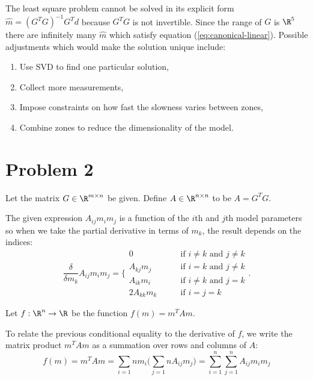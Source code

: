 \documentclass{homework}
\begin{document}
\begin{letterenum}
\item The least square problem cannot be solved in its explicit form $\hat{m} = (G^T G)^{-1} G^T d$ because $G^T G$ is not invertible.
Since the range of $G$ is $\R^5$ there are infinitely many $\hat{m}$ which satisfy equation (\ref{eq:canonical-linear}). Possible adjustments which
would make the solution unique include:
\begin{enumerate}
    \item Use SVD to find one particular solution,
    \item Collect more measurements,
    \item Impose constraints on how fast the slowness varies between zones,
    \item Combine zones to reduce the dimensionality of the model.
\end{enumerate}

\end{letterenum}

\section{Problem 2}
Let the matrix $G\in\R^{m \times n}$ be given. Define $A\in \R^{n\times n}$ to be $A = G^T G$.

The given expression $A_{ij} m_i m_j$ is a function of the $i$th and $j$th model parameters so when we 
take the partial derivative in terms of $m_k$, the result depends on the indices:
\begin{equation}
    \frac{\delta}{\delta m_k} A_{ij} m_i m_j =  \biggl\{
        \begin{array}{ll}
            0 &\qquad \text{if } i \neq k \text{ and } j\neq k \\
            A_{kj} m_j &\qquad \text{if } i = k \text{ and } j\neq k \\
            A_{ik} m_i &\qquad \text{if } i \neq k \text{ and } j= k \\
            2A_{kk} m_k &\qquad \text{if } i = j = k
        \end{array}
    \biggr.
    \label{eq:conditional-partial}
\end{equation}

Let $f: \R^n \to \R$ be the function $f(m) = m^T A m$.

To relate the previous conditional equality to the derivative of $f$, we write the matrix product $m^T A m$ as a summation over rows and columns of $A$:
\begin{equation}
    f(m) = m^T A m = \sum_{i=1}{n} m_i \biggl(\sum_{j=1}{n} A_{ij} m_j\biggr) = \sum_{i=1}^{n} \sum_{j=1}^n A_{ij} m_i m_j
    \label{eq:summation-form}
\end{equation}
\end{document}
